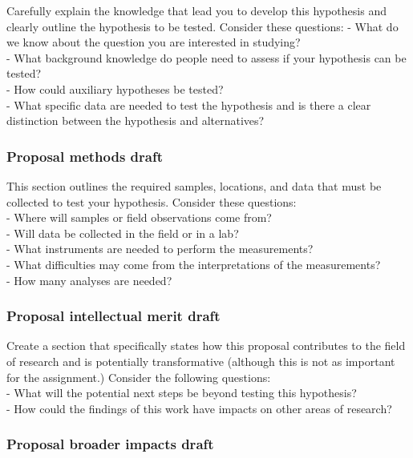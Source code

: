\documentclass[11pt,]{article}
\begin{document}
Carefully explain the knowledge that lead you to develop this hypothesis
and clearly outline the hypothesis to be tested. Consider these
questions: - What do we know about the question you are interested in
studying?\\
- What background knowledge do people need to assess if your hypothesis
can be tested?\\
- How could auxiliary hypotheses be tested?\\
- What specific data are needed to test the hypothesis and is there a
clear distinction between the hypothesis and alternatives?

\subsubsection{Proposal methods draft}\label{proposal-methods-draft}

This section outlines the required samples, locations, and data that
must be collected to test your hypothesis. Consider these questions:\\
- Where will samples or field observations come from?\\
- Will data be collected in the field or in a lab?\\
- What instruments are needed to perform the measurements?\\
- What difficulties may come from the interpretations of the
measurements?\\
- How many analyses are needed?

\subsubsection{Proposal intellectual merit
draft}\label{proposal-intellectual-merit-draft}

Create a section that specifically states how this proposal contributes
to the field of research and is potentially transformative (although
this is not as important for the assignment.) Consider the following
questions:\\
- What will the potential next steps be beyond testing this
hypothesis?\\
- How could the findings of this work have impacts on other areas of
research?

\subsubsection{Proposal broader impacts
draft}\label{proposal-broader-impacts-draft}
\end{document}
